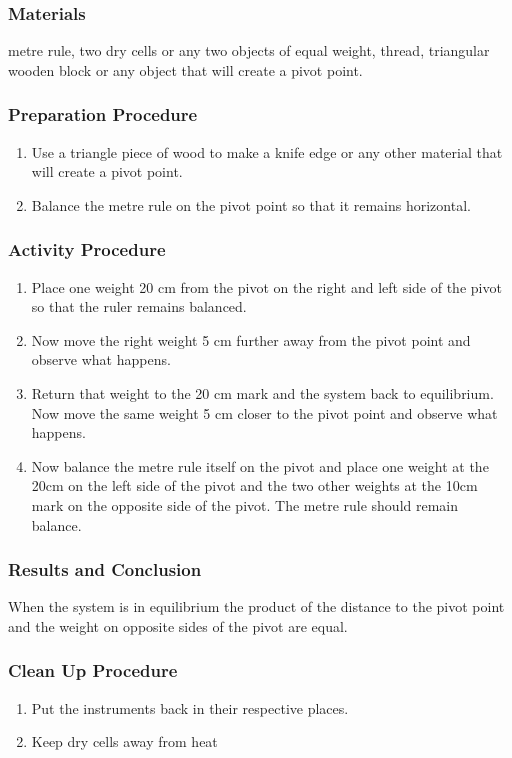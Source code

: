 \subsubsection*{Materials}
metre rule, two dry cells or any two objects of equal weight, thread, triangular wooden block or any object that will create a pivot point.  

\subsubsection*{Preparation Procedure}
\begin{enumerate}
\item{Use a triangle piece of wood to make a knife edge or any other material that will create a pivot point.} 
\item{Balance the metre rule on the pivot point so that it remains horizontal.} 
\end{enumerate}

\subsubsection*{Activity Procedure}
\begin{enumerate}
\item{Place one weight 20 cm from the pivot on the right and left side of the pivot so that the ruler remains balanced.} 
\item{Now move the right weight 5 cm further away from the pivot point and observe what happens.} 
\item{Return that weight to the 20 cm mark and the system back to equilibrium. Now move the same weight 5 cm closer to the pivot point and observe what happens.} 
\item{Now balance the metre rule itself on the pivot and place one weight at the 20cm on the left side of the pivot and the two other weights at the 10cm mark on the opposite side of the pivot. The metre rule should remain balance.} 
\end{enumerate}

\subsubsection*{Results and Conclusion}
When the system is in equilibrium the product of the distance to the pivot point and the weight on opposite sides of the pivot are equal.  

\subsubsection*{Clean Up Procedure}
\begin{enumerate}
\item{Put the instruments back in their respective places.} 
\item{Keep dry cells away from heat}
\end{enumerate}

